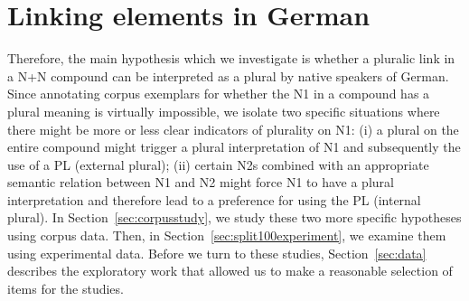 \section{Linking elements in German}
\label{sec:linkingelementsingerman}


Therefore, the main hypothesis which we investigate is whether a pluralic link in a N+N compound can be interpreted as a plural by native speakers of German.
Since annotating corpus exemplars for whether the N1 in a compound has a plural meaning is virtually impossible, we isolate two specific situations where there might be more or less clear indicators of plurality on N1:
(i) a plural on the entire compound might trigger a plural interpretation of N1 and subsequently the use of a PL (external plural);
(ii) certain N2s combined with an appropriate semantic relation between N1 and N2 might force N1 to have a plural interpretation and therefore lead to a preference for using the PL (internal plural).
In Section~\ref{sec:corpusstudy}, we study these two more specific hypotheses using corpus data.
Then, in Section~\ref{sec:split100experiment}, we examine them using experimental data.
Before we turn to these studies, Section~\ref{sec:data} describes the exploratory work that allowed us to make a reasonable selection of items for the studies.
